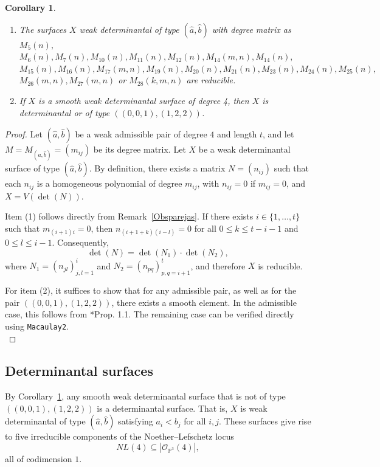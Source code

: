 \documentclass[12pt,reqno]{amsart}
\theoremstyle{plain}
\newtheorem{cor}[theorem]{Corollary}
\theoremstyle{definition}
\theoremstyle{remark}
\theoremstyle{definition}
\begin{document}
\begin{cor} \label{Xsuave}
\begin{enumerate}
    \item The surfaces $X$ weak determinantal of type $(\hat{a},\hat{b})$ with degree matrix as $M_{5}(n),$
    $ M_{6}(n), M_{7}(n), M_{10}(n), M_{11}(n), M_{12}(n), M_{14}(m,n), M_{14}(n),$\\$M_{15}(n), M_{16}(n), M_{17}(m,n), M_{19}(n), M_{20}(n), M_{21}(n), M_{23}(n), M_{24}(n), M_{25}(n),$\\ $ M_{26}(m,n),
     M_{27}(m,n)$ or $M_{28}(k,m,n)$ are reducible.

 \item If $X$ is a smooth weak determinantal surface of degree 4, then $X$ is determinantal or of type $((0,0,1),(1,2,2))$. 
\end{enumerate}
\end{cor}
\begin{proof}
Let $(\hat{a},\hat{b})$ be a weak admissible pair of degree $4$ and length $t$, and let $M=M_{(\hat{a},\hat{b})}=(m_{ij})$ be its degree matrix. Let $X$ be a weak determinantal surface of type $(\hat{a},\hat{b})$. By definition, there exists a matrix $N=(n_{ij})$ such that each $n_{ij}$ is a homogeneous polynomial of degree $m_{ij}$, with $n_{ij}=0$ if $m_{ij}=0$, and $X=V(\det(N))$.

Item (1) follows directly from Remark~\ref{Obsparejas}. If there exists $i\in\{1,\ldots,t\}$ such that $m_{(i+1)i}=0$, then $n_{(i+1+k)(i-l)}=0$ for all $0\leq k\leq t-i-1$ and $0\leq l\leq i-1$. Consequently,
\[
\det(N)=\det(N_1)\cdot\det(N_2),
\]
where $N_1=(n_{jl})_{j,l=1}^{i}$ and $N_2=(n_{pq})_{p,q=i+1}^{t}$, and therefore $X$ is reducible.

For item (2), it suffices to show that for any admissible pair, as well as for the pair $((0,0,1),(1,2,2))$, there exists a smooth element. In the admissible case, this follows from \cite{LLV}*{Prop. 1.1}. The remaining case can be verified directly using \texttt{Macaulay2}.\\
\end{proof}


\subsection{Determinantal surfaces}

By Corollary~\ref{Xsuave}, any smooth weak determinantal surface that is not of type
$((0,0,1),(1,2,2))$ is a determinantal surface. That is, $X$ is weak determinantal of
type $(\hat{a},\hat{b})$ satisfying $a_i<b_j$ for all $i,j$. These surfaces give rise
to five irreducible components of the Noether--Lefschetz locus
\[
NL(4)\subseteq |\mathcal{O}_{\mathbb{P}^3}(4)|,
\]
all of codimension $1$.
\end{document}
